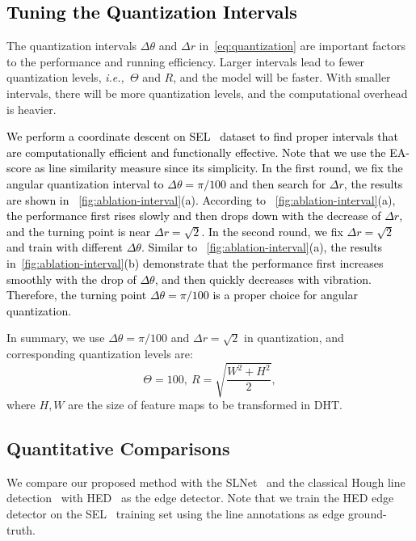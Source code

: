 \documentclass[10pt,journal,cspaper,compsoc]{IEEEtran}
\newcommand{\revise}[1]{{\textcolor{black}{#1}}}
\def\ie{\emph{i.e.,~}}
\begin{document}
\subsection{\revise{Tuning the Quantization Intervals}}\label{sec:quant-intervals}
The quantization intervals $\Delta\theta$ and $\Delta r$ in~\cref{eq:quantization}
are important factors to the performance and running efficiency.
%
Larger intervals lead to fewer quantization levels, \ie $\Theta$ and $R$,
and the model will be faster.
%
With smaller intervals, there will be more quantization levels,
and the computational overhead is heavier.

\revise{We perform a coordinate descent on SEL~\cite{lee2017semantic} dataset
to find proper intervals that are computationally efficient and functionally
effective.
%
Note that we use the EA-score as line similarity measure since its simplicity.
%
In the first round, we fix the angular quantization interval to $\Delta\theta=\pi/100$
and then search for $\Delta r$,
the results are shown in ~\cref{fig:ablation-interval}(a).
%
According to ~\cref{fig:ablation-interval}(a),
the performance first rises slowly and then drops down with the decrease of $\Delta r$,
and the turning point is near $\Delta r = \sqrt{2}$.
%
In the second round, we fix $\Delta r = \sqrt{2}$ and train with different $\Delta\theta$.
%
Similar to ~\cref{fig:ablation-interval}(a),
the results in~\cref{fig:ablation-interval}(b) demonstrate that
the performance first increases smoothly with the drop of $\Delta \theta$,
and then quickly decreases with vibration.
%
Therefore, the turning point $\Delta\theta=\pi/100$ is a proper choice for angular quantization.}

In summary, we use $\Delta\theta=\pi/100$ and $\Delta r = \sqrt{2}$
in quantization, and corresponding quantization levels are:
\begin{equation}
    \Theta = 100, \ R = \sqrt{\frac{W^2+H^2}{2}},
  \label{eq:intervals}
\end{equation}
where $H, W$ are the size of feature maps to be transformed in DHT.
\subsection{Quantitative Comparisons} \label{sec:quantitative}
We compare our proposed method with the SLNet~\cite{lee2017semantic}
and the classical Hough line detection~\cite{duda1971use} with HED~\cite{xie2015holistically}
as the edge detector.
%
Note that we train the HED edge detector on the SEL~\cite{lee2017semantic} training set
using the line annotations as edge ground-truth.
\end{document}
